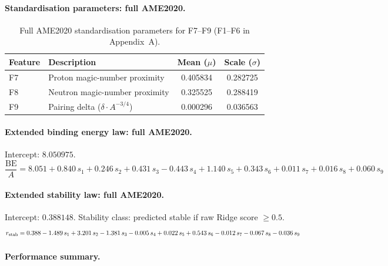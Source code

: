 \documentclass[9pt,twocolumn]{extarticle}
\newcommand{\BE}{\text{BE}}
\begin{document}
\paragraph{Standardisation parameters: full AME2020.}

\begin{table}[H]
\centering\small
\caption{Full AME2020 standardisation parameters for F7--F9 (F1--F6 in Appendix~A).}
\label{tab:ext-scale}
\begin{tabular}{@{}llcc@{}}
\toprule
Feature & Description & Mean ($\mu$) & Scale ($\sigma$) \\
\midrule
F7 & Proton magic-number proximity & 0.405834 & 0.282725 \\
F8 & Neutron magic-number proximity & 0.325525 & 0.288419 \\
F9 & Pairing delta ($\delta\cdot A^{-3/4}$) & 0.000296 & 0.036563 \\
\bottomrule
\end{tabular}
\end{table}

\paragraph{Extended binding energy law: full AME2020.}
Intercept: $8.050975$.
\begin{equation}
\frac{\BE}{A} = 8.051 +
  0.840\,s_1 + 0.246\,s_2 + 0.431\,s_3 - 0.443\,s_4 + 1.140\,s_5
  + 0.343\,s_6 + 0.011\,s_7 + 0.016\,s_8 + 0.060\,s_9
\end{equation}

\paragraph{Extended stability law: full AME2020.}
Intercept: $0.388148$.  Stability class: predicted stable if raw Ridge score $\geq 0.5$.
\begin{equation}
r_{\rm stab} = 0.388
  - 1.489\,s_1 + 3.201\,s_2 - 1.381\,s_3 - 0.005\,s_4 + 0.022\,s_5
  + 0.543\,s_6 - 0.012\,s_7 - 0.067\,s_8 - 0.036\,s_9
\end{equation}

\paragraph{Performance summary.}
\end{document}
